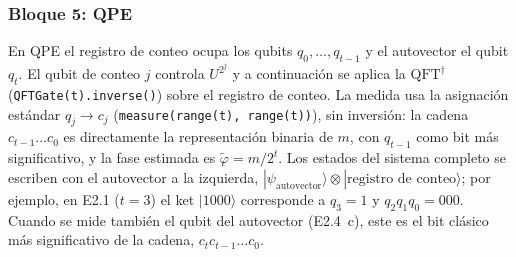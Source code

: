 \subsubsection*{Bloque 5: QPE}
En QPE el registro de conteo ocupa los qubits $q_0,\dots,q_{t-1}$ y el autovector el qubit $q_t$. El qubit de conteo $j$ controla $U^{2^j}$ y a continuación se aplica la
$\mathrm{QFT}^\dagger$ (\texttt{QFTGate(t).inverse()}) sobre el registro de conteo. La medida usa la asignación estándar $q_j\to c_j$ (\texttt{measure(range(t), range(t))}),
sin inversión: la cadena $c_{t-1}\dots c_0$ es directamente la representación binaria de $m$, con $q_{t-1}$ como bit más significativo, y la fase estimada es $\tilde\varphi=m/2^t$.
Los estados del sistema completo se escriben con el autovector a la izquierda, $|{\psi_{\text{autovector}}}\rangle\otimes|{\text{registro de conteo}}\rangle$; por ejemplo,
en E2.1 ($t=3$) el ket $|1000\rangle$ corresponde a $q_3=1$ y $q_2q_1q_0=000$. Cuando se mide también el qubit del autovector (E2.4~c), este es el bit clásico más
significativo de la cadena, $c_tc_{t-1}\dots c_0$.
